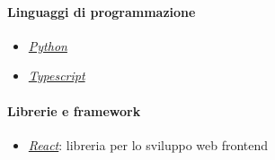 \paragraph*{Linguaggi di programmazione}
\begin{itemize}
	\item \href{https://www.python.org/}{\emph{Python}}
	\item \href{https://www.typescriptlang.org/}{\emph{Typescript}}
\end{itemize}
\paragraph*{Librerie e framework}
\begin{itemize}
	\item \href{https://reactjs.org/}{\emph{React}}: libreria per lo sviluppo web frontend
\end{itemize}
